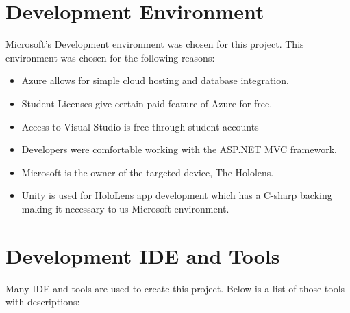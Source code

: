 \section{Development Environment}
Microsoft's Development environment was chosen for this project. This environment
was chosen for the following reasons:

\begin{itemize}
    \item Azure allows for simple cloud hosting and database integration.

    \item Student Licenses give certain paid feature of Azure for free.
    
    \item Access to Visual Studio is free through student accounts

    \item Developers were comfortable working with the ASP.NET MVC framework.

    \item Microsoft is the owner of the targeted device, The Hololens.

    \item Unity is used for HoloLens app development which has a C-sharp backing making it necessary to us Microsoft environment.

\end{itemize}

\section{Development IDE and Tools}
Many IDE and tools are used to create this project. Below is a list of those
tools with descriptions:


